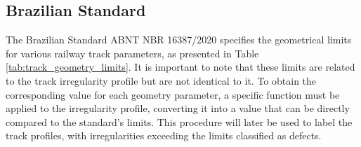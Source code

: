 \subsection{Brazilian Standard} \label{sec-Brazil-Standard}

The Brazilian Standard ABNT NBR 16387/2020 \cite{abnt:nbr16387:2020} specifies the geometrical limits for various railway track parameters, as presented in Table \ref{tab:track_geometry_limits}. It is important to note that these limits are related to the track irregularity profile but are not identical to it. To obtain the corresponding value for each geometry parameter, a specific function must be applied to the irregularity profile, converting it into a value that can be directly compared to the standard's limits. This procedure will later be used to label the track profiles, with irregularities exceeding the limits classified as defects.

